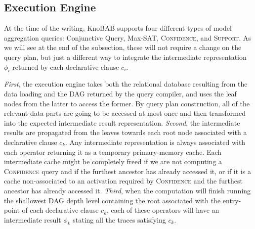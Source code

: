 
\subsection{Execution Engine} \label{ssec:xltlf}
At the time of the writing, KnoBAB supports four different types of model aggregation queries: Conjunctive Query, Max-SAT, \textsc{Confidence}, and \textsc{Support}. As we will see at the end of the subsection, these will not require a change on the query plan, but just a different way to integrate the intermediate representation $\phi_i$ returned by each declarative clause $c_i$. 

\textit{First}, the execution engine takes both the relational database resulting from the data loading and the DAG returned by the query compiler, and uses the leaf nodes from the latter to access the former. By query plan construction, all of the relevant data parts are going to be accessed at most once and then transformed into the expected intermediate result representation. \textit{Second}, the intermediate results are propagated from the leaves towards each root node associated with a declarative clause $c_k$. Any intermediate representation is always associated with each operator returning it as a temporary primary-memory cache. Each intermediate cache  might be completely freed if we are not computing a  \textsc{Confidence} query and if the furthest ancestor has already accessed it, or if it is a cache non-associated to an activation required by \textsc{Confidence} and the furthest ancestor has already accessed it. \textit{Third}, when the computation will finish running the shallowest DAG depth level containing the \xLTLf root associated with the entry-point of each declarative clause $c_k$, each of these operators will have an intermediate result $\phi_k$ stating all the traces satisfying $c_k$.

